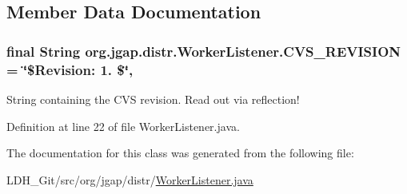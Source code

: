 \subsection{Member Data Documentation}
\hypertarget{classorg_1_1jgap_1_1distr_1_1_worker_listener_a6217dee2e483e6e76a532765831ab1e6}{
\subsubsection[{C\-V\-S\-\_\-\-R\-E\-V\-I\-S\-I\-O\-N}]{\setlength{\rightskip}{0pt plus 5cm}final String org.\-jgap.\-distr.\-Worker\-Listener.\-C\-V\-S\-\_\-\-R\-E\-V\-I\-S\-I\-O\-N = \char`\"{}\$Revision\-: 1. \$\char`\"{}\hspace{0.3cm}{\ttfamily [static]}, {\ttfamily [private]}}}\label{classorg_1_1jgap_1_1distr_1_1_worker_listener_a6217dee2e483e6e76a532765831ab1e6}
String containing the C\-V\-S revision. Read out via reflection! 

Definition at line 22 of file Worker\-Listener.\-java.



The documentation for this class was generated from the following file\-:\begin{DoxyCompactItemize}
\item 
L\-D\-H\-\_\-\-Git/src/org/jgap/distr/\hyperlink{_worker_listener_8java}{Worker\-Listener.\-java}\end{DoxyCompactItemize}
